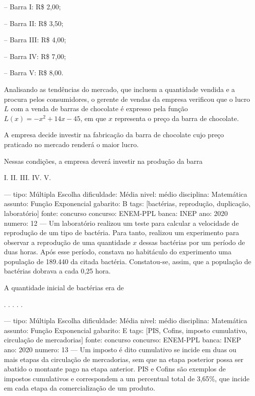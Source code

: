-- Barra I: R\$ 2,00;

-- Barra II: R\$ 3,50;

-- Barra III: R\$ 4,00;

-- Barra IV: R\$ 7,00;

-- Barra V: R\$ 8,00.

Analisando as tendências do mercado, que incluem a quantidade vendida e a procura pelos consumidores, o gerente de vendas da empresa verificou que o lucro \( L \) com a venda de barras de chocolate é expresso pela função \( L(x) = -x^2 + 14x - 45 \), em que \( x \) representa o preço da barra de chocolate.

A empresa decide investir na fabricação da barra de chocolate cujo preço praticado no mercado renderá o maior lucro.

Nessas condições, a empresa deverá investir na produção da barra
\begin{oneparchoices}
\choice I.
\choice II.
\choice III.
\correctchoice IV.
\choice V.
\end{oneparchoices}

---
tipo: Múltipla Escolha
dificuldade: Média
nivel: médio
disciplina: Matemática
assunto: Função Exponencial
gabarito: B
tags: [bactérias, reprodução, duplicação, laboratório]
fonte: concurso
concurso: ENEM-PPL
banca: INEP
ano: 2020
numero: 12
---
\question
Um laboratório realizou um teste para calcular a velocidade de reprodução de um tipo de bactéria. Para tanto, realizou um experimento para observar a reprodução de uma quantidade \( x \) dessas bactérias por um período de duas horas. Após esse período, constava no habitáculo do experimento uma população de 189.440 da citada bactéria. Constatou-se, assim, que a população de bactérias dobrava a cada 0,25 hora.

A quantidade inicial de bactérias era de
\begin{oneparchoices}
.
.
.
.
.
\end{oneparchoices}

---
tipo: Múltipla Escolha
dificuldade: Média
nivel: médio
disciplina: Matemática
assunto: Função Exponencial
gabarito: E
tags: [PIS, Cofins, imposto cumulativo, circulação de mercadorias]
fonte: concurso
concurso: ENEM-PPL
banca: INEP
ano: 2020
numero: 13
---
\question
Um imposto é dito cumulativo se incide em duas ou mais etapas da circulação de mercadorias, sem que na etapa posterior possa ser abatido o montante pago na etapa anterior. PIS e Cofins são exemplos de impostos cumulativos e correspondem a um percentual total de 3,65\%, que incide em cada etapa da comercialização de um produto.

